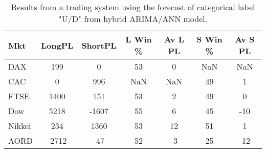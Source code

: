 \begin{table}[ht]
\centering
\caption[Results from a trading system using the forecast of categorical label "U/D" from hybrid ARIMA/ANN model]{Results from a trading system using the forecast of categorical label "U/D" from hybrid ARIMA/ANN model.} 
\label{tab:chp_ts:pUD_CAT_arima_ann_sys}
\begin{tabular}{lcccccc}
  \toprule Mkt & LongPL & ShortPL & L Win \% & Av L PL & S Win \% & Av S PL \\ 
  \midrule DAX & 199 & 0 & 53 & 0 & NaN & NaN \\ 
  CAC & 0 & 996 & NaN & NaN & 49 & 1 \\ 
  FTSE & 1400 & 151 & 53 & 2 & 49 & 0 \\ 
  Dow & 5218 & -1607 & 55 & 6 & 45 & -10 \\ 
  Nikkei & 234 & 1360 & 53 & 12 & 51 & 1 \\ 
  AORD & -2712 & -47 & 52 & -3 & 25 & -12 \\ 
   \bottomrule \end{tabular}
\end{table}
